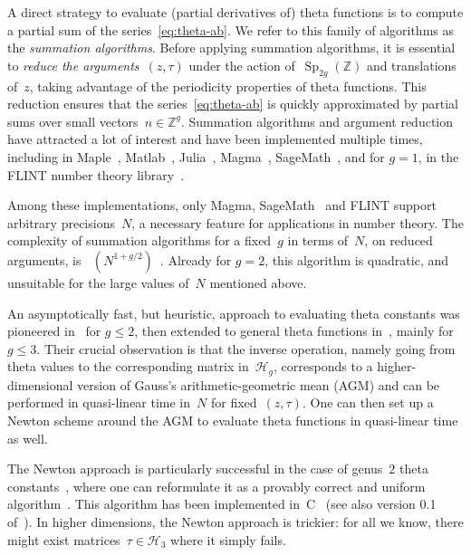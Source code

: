 \documentclass[12pt,oneside]{amsart}
\numberwithin{equation}{section}
\theoremstyle{definition}
\newcommand{\Z}{\mathbb{Z}}
\newcommand{\Half}{\mathcal{H}}
\DeclareMathOperator{\Sp}{Sp}
\DeclareMathOperator{\Otilde}{\widetilde{\mathit{O}}}
\begin{document}
A direct strategy to evaluate (partial derivatives of) theta functions is to
compute a partial sum of the series~\eqref{eq:theta-ab}. We refer to this
family of algorithms as the \emph{summation algorithms}. Before applying
summation algorithms, it is essential to \emph{reduce the arguments}~$(z,\tau)$
under the action of~$\Sp_{2g}(\Z)$ and translations of~$z$, taking advantage of
the periodicity properties of theta functions. This reduction ensures that the
series~\eqref{eq:theta-ab} is quickly approximated by partial sums over small
vectors~$n\in \Z^g$. Summation algorithms and argument reduction have attracted
a lot of interest and have been implemented multiple times, including in
Maple~\cite{deconinckComputingRiemannTheta2004},
Matlab~\cite{frauendienerEfficientComputationMultidimensional2019},
Julia~\cite{agostiniComputingThetaFunctions2021},
Magma~\cite{bosmaMagmaAlgebraSystem1997},
SageMath~\cite{swierczewskiComputingRiemannTheta2016,
  bruinRiemannThetaSageMathPackage2021}, and for $g=1$, in the FLINT number
theory library~\cite{engeShortAdditionSequences2018}.

Among these implementations, only Magma,
SageMath~\cite{bruinRiemannThetaSageMathPackage2021} and FLINT support
arbitrary precisions~$N$, a necessary feature for applications in number
theory. The complexity of summation algorithms for a fixed~$g$ in terms of~$N$,
on reduced arguments, is $\Otilde(N^{1 + g/2})$~\cite[Thms.~3
and~8]{deconinckComputingRiemannTheta2004}. Already for $g=2$, this algorithm
is quadratic, and unsuitable for the large values of~$N$ mentioned above.

An asymptotically fast, but heuristic, approach to evaluating theta constants
was pioneered in~\cite{dupontMoyenneArithmeticogeometriqueSuites2006,
  dupontFastEvaluationModular2011} for $g\leq 2$, then extended to general
theta functions in~\cite{labrandeComputingThetaFunctions2016}, mainly for
$g\leq 3$. Their crucial observation is that the inverse operation, namely
going from theta values to the corresponding matrix in~$\Half_g$, corresponds
to a higher-dimensional version of Gauss's arithmetic-geometric mean (AGM) and
can be performed in quasi-linear time in~$N$ for fixed~$(z,\tau)$. One can
then set up a Newton scheme around the AGM to evaluate theta functions in
quasi-linear time as well.

The Newton approach is particularly successful in the case of genus~$2$ theta
constants~\cite{engeComputingClassPolynomials2014,
  vanbommelComputingIsogenyClasses2024}, where one can reformulate it as a
provably correct and uniform
algorithm~\cite{kiefferCertifiedEwtonSchemes2022}. This algorithm has been
implemented in~C~\cite{engeCMHComputationGenus2014} (see also version 0.1
of~\cite{kiefferHDMELibraryEvaluation2022}). In higher dimensions, the Newton
approach is trickier: for all we know, there might exist
matrices~$\tau\in \Half_3$ where it simply fails.
\end{document}
